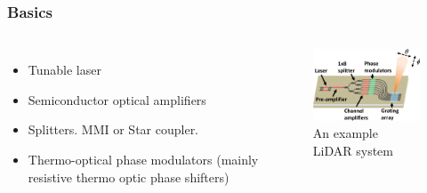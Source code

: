 \documentclass{beamer}
\begin{document}
\begin{frame}
\frametitle{Basics}
\begin{columns}[c] %

\begin{itemize}
\item Tunable laser
\item Semiconductor optical amplifiers 
\item Splitters. MMI or Star coupler.
\item Thermo-optical phase modulators (mainly resistive thermo optic phase shifters)
\end{itemize}

   \begin{figure}[htbp]
    \begin{center}
    \includegraphics[width=6cm]{graphs/pic3}
    \caption{An example LiDAR system \cite{pic3}}
    \label{default}
    \end{center}
    \end{figure}

\end{columns}
\end{frame}
%
\end{document}
